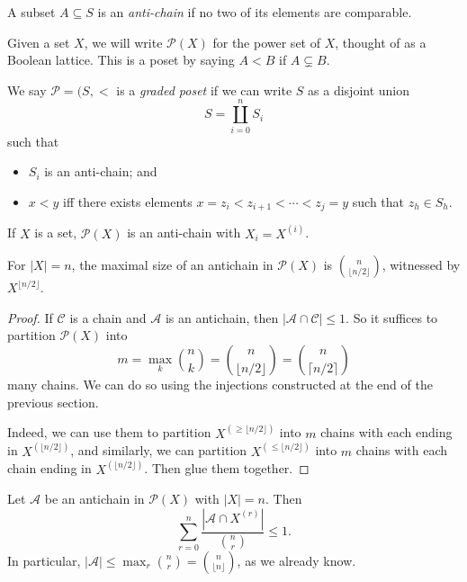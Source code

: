 \documentclass[a4paper]{article}
\begin{document}
\begin{defi}
  A subset $A \subseteq S$ is an \emph{anti-chain} if no two of its elements are comparable.
\end{defi}

Given a set $X$, we will write $\mathcal{P}(X)$ for the power set of $X$, thought of as a Boolean lattice. This is a poset by saying $A < B$ if $A \subsetneq B$.

\begin{defi}
  We say $\mathcal{P} = (S, <$ is a \emph{graded poset} if we can write $S$ as a disjoint union
  \[
    S = \coprod_{i = 0}^n S_i %
  \]
  such that
  \begin{itemize}
    \item $S_i$ is an anti-chain; and
    \item $x < y$ iff there exists elements $x = z_i < z_{i + 1} < \cdots < z_j = y$ such that $z_h \in S_h$.
  \end{itemize}
\end{defi}
\begin{eg}
  If $X$ is a set, $\mathcal{P}(X)$ is an anti-chain with $X_i = X^{(i)}$.
\end{eg}
\begin{thm}[Sperner, 1928]
  For $|X| = n$, the maximal size of an antichain in $\mathcal{P}(X)$ is $\binom{n}{\lfloor n/2\rfloor}$, witnessed by $X^{\lfloor n/2\rfloor}$.
\end{thm}

\begin{proof}
  If $\mathcal{C}$ is a chain and $\mathcal{A}$ is an antichain, then $|\mathcal{A} \cap \mathcal{C}| \leq 1$. So it suffices to partition $\mathcal{P}(X)$ into
  \[
    m = \max_{k} \binom{n}{k} = \binom{n}{\lfloor n/2\rfloor} = \binom{n}{\lceil n/2 \rceil}
  \]
  many chains. We can do so using the injections constructed at the end of the previous section.

  Indeed, we can use them to partition $X^{(\geq \lfloor n/2 \rfloor)}$ into $m$ chains with each ending in $X^{(\lfloor n/2\rfloor)}$, and similarly, we can partition $X^{(\leq \lfloor n/2\rfloor)}$ into $m$ chains with each chain ending in $X^{(\lfloor n/2\rfloor)}$. Then glue them together.


\end{proof}

\begin{thm}
  Let $\mathcal{A}$ be an antichain in $\mathcal{P}(X)$ with $|X| = n$. Then
  \[
    \sum_{r = 0}^n \frac{|\mathcal{A} \cap X^{(r)}|}{\binom{n}{r}} \leq 1.
  \]
  In particular, $|\mathcal{A}| \leq \max_r \binom{n}{r} = \binom{n}{\lfloor n\rfloor}$, as we already know.
\end{thm}
\end{document}
